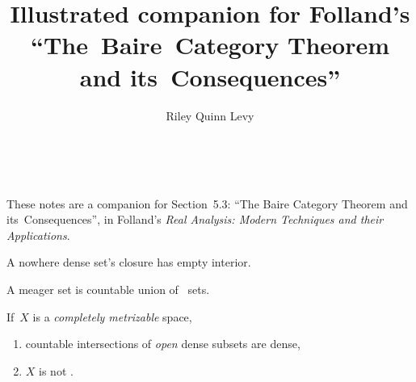 \documentclass{scrartcl}
\author{Riley Quinn Levy}
\title{Illustrated companion for Folland's ``The~Baire~Category Theorem and its~Consequences''}
\begin{document}
\begin{center}
  \begin{minipage}{.8\linewidth}
    \centering
    {\normalfont\bfseries\LARGE\color[gray]{.3}\@title}
  \end{minipage} \\
  \@author{}\quad\@date
  \makeatother
\end{center}
These notes are a companion for Section~5.3: ``The Baire Category Theorem and its~Consequences'', in Folland's \emph{Real Analysis: Modern Techniques and their Applications}.
\begin{defn}\label{nowhere-dense}
  A nowhere dense set's closure has empty interior.\cite{nowhere-dense}
\end{defn}
\begin{defn}[meager]\label{meager}
  A meager set is countable union of ~sets. \cite[pg.\ 161]{folland}
\end{defn}
\begin{theorem}\label{baire category}
  If\eurelitcorrect\ \(X\) is a \emph{completely metrizable} space,
  \begin{enumerate}
  \item countable intersections of \emph{open} dense subsets are dense,
  \item \(X\) is not . \cite[pg.\ 161]{folland}
  \end{enumerate}
\end{theorem}
\end{document}
